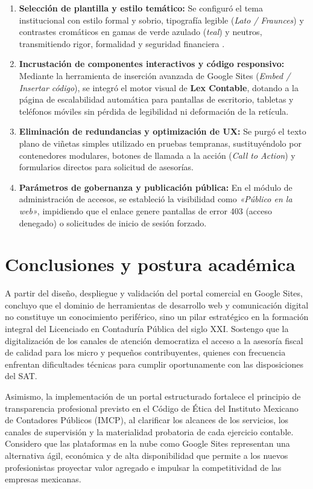 {\begin{enumerate}
\item \textbf{Selección de plantilla y estilo temático:} Se configuró el tema institucional con estilo formal y sobrio, tipografía legible (\textit{Lato / Fraunces}) y contrastes cromáticos en gamas de verde azulado (\textit{teal}) y neutros, transmitiendo rigor, formalidad y seguridad financiera \parencite{googleSitesAyuda}.
\item \textbf{Incrustación de componentes interactivos y código responsivo:} Mediante la herramienta de inserción avanzada de Google Sites (\textit{Embed / Insertar código}), se integró el motor visual de \textbf{Lex Contable}, dotando a la página de escalabilidad automática para pantallas de escritorio, tabletas y teléfonos móviles sin pérdida de legibilidad ni deformación de la retícula.
\item \textbf{Eliminación de redundancias y optimización de UX:} Se purgó el texto plano de viñetas simples utilizado en pruebas tempranas, sustituyéndolo por contenedores modulares, botones de llamada a la acción (\textit{Call to Action}) y formularios directos para solicitud de asesorías.
\item \textbf{Parámetros de gobernanza y publicación pública:} En el módulo de administración de accesos, se estableció la visibilidad como \textit{«Público en la web»}, impidiendo que el enlace genere pantallas de error 403 (acceso denegado) o solicitudes de inicio de sesión forzado.
\end{enumerate}

\section{Conclusiones y postura académica}
A partir del diseño, despliegue y validación del portal comercial en Google Sites, concluyo que el dominio de herramientas de desarrollo web y comunicación digital no constituye un conocimiento periférico, sino un pilar estratégico en la formación integral del Licenciado en Contaduría Pública del siglo XXI. Sostengo que la digitalización de los canales de atención democratiza el acceso a la asesoría fiscal de calidad para los micro y pequeños contribuyentes, quienes con frecuencia enfrentan dificultades técnicas para cumplir oportunamente con las disposiciones del SAT.

Asimismo, la implementación de un portal estructurado fortalece el principio de transparencia profesional previsto en el Código de Ética del Instituto Mexicano de Contadores Públicos (IMCP), al clarificar los alcances de los servicios, los canales de supervisión y la materialidad probatoria de cada ejercicio contable. Considero que las plataformas en la nube como Google Sites representan una alternativa ágil, económica y de alta disponibilidad que permite a los nuevos profesionistas proyectar valor agregado e impulsar la competitividad de las empresas mexicanas.
}


